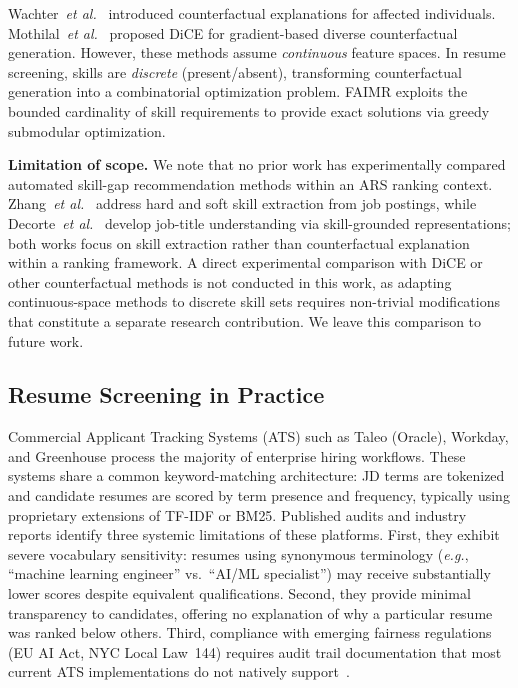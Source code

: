 \documentclass[smallcondensed,numbers]{sn-jnl}
\begin{document}
Wachter~\textit{et al.}~\cite{wachter2017counterfactual} introduced counterfactual explanations for affected individuals. Mothilal~\textit{et al.}~\cite{mothilal2020dice} proposed DiCE for gradient-based diverse counterfactual generation. However, these methods assume \textit{continuous} feature spaces. In resume screening, skills are \textit{discrete} (present/absent), transforming counterfactual generation into a combinatorial optimization problem. FAIMR exploits the bounded cardinality of skill requirements to provide exact solutions via greedy submodular optimization.

\textbf{Limitation of scope.} We note that no prior work has experimentally compared automated skill-gap recommendation methods within an ARS ranking context. Zhang~\textit{et al.}~\cite{zhang2022skillspan} address hard and soft skill extraction from job postings, while Decorte~\textit{et al.}~\cite{decorte2022jobbert} develop job-title understanding via skill-grounded representations; both works focus on skill extraction rather than counterfactual explanation within a ranking framework. A direct experimental comparison with DiCE or other counterfactual methods is not conducted in this work, as adapting continuous-space methods to discrete skill sets requires non-trivial modifications that constitute a separate research contribution. We leave this comparison to future work.

\subsection{Resume Screening in Practice}
\label{sec:related_practice}

Commercial Applicant Tracking Systems (ATS) such as Taleo (Oracle), Workday, and Greenhouse process the majority of enterprise hiring workflows. These systems share a common keyword-matching architecture: JD terms are tokenized and candidate resumes are scored by term presence and frequency, typically using proprietary extensions of TF-IDF or BM25. Published audits and industry reports identify three systemic limitations of these platforms. First, they exhibit severe vocabulary sensitivity: resumes using synonymous terminology (\textit{e.g.}, ``machine learning engineer'' vs.\ ``AI/ML specialist'') may receive substantially lower scores despite equivalent qualifications. Second, they provide minimal transparency to candidates, offering no explanation of why a particular resume was ranked below others. Third, compliance with emerging fairness regulations (EU AI Act, NYC Local Law~144) requires audit trail documentation that most current ATS implementations do not natively support~\cite{raghavan2020mitigating}.
\end{document}
